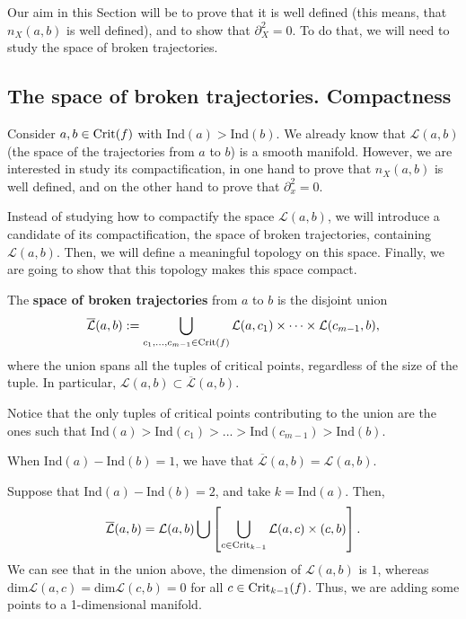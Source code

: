 Our aim in this Section will be to prove that it is well defined (this means, that $n_X(a,b)$ is well defined), and to show that $\partial_X^2 = 0$. To do that, we will need to study the space of broken trajectories.

\subsection{The space of broken trajectories. Compactness}

Consider $a, b \in \mathrm{Crit}(f)$ with $\text{Ind}(a) > \text{Ind}(b)$. We already know that $\mathcal{L}(a,b)$ (the space of the trajectories from $a$ to $b$) is a smooth manifold. However, we are interested in study its compactification, in one hand to prove that $n_X(a,b)$ is well defined, and on the other hand to prove that $\partial_x^2 = 0$.

Instead of studying how to compactify the space $\mathcal{L}(a,b)$, we will introduce a candidate of its compactification, the space of broken trajectories, containing $\mathcal{L}(a,b)$. Then, we will define a meaningful topology on this space. Finally, we are going to show that this topology makes this space compact.

\begin{deff}
The {\bf space of broken trajectories} from $a$ to $b$ is the disjoint union
\[\overline{\mathcal{L}}(a,b) := \bigcup_{c_1,...,c_{m-1} \in \mathrm{Crit}(f)} \mathcal{L}(a,c_1) \times \cdots \times \mathcal{L}(c_{m-1},b) ,\]
where the union spans all the tuples of critical points, regardless of the size of the tuple. In particular, $\mathcal{L}(a,b) \subset \overline{\mathcal{L}}(a,b)$.

Notice that the only tuples of critical points contributing to the union are the ones such that $\text{Ind}(a) > \text{Ind}(c_1) > ... > \text{Ind}(c_{m-1}) > \text{Ind}(b)$.
\end{deff}

\begin{rmrk}
When $\text{Ind}(a) - \text{Ind}(b) = 1$, we have that $\overline{\mathcal{L}}(a,b) = \mathcal{L}(a,b)$.
\end{rmrk}

\begin{rmrk}
Suppose that $\text{Ind}(a) - \text{Ind}(b) = 2$, and take $k = \text{Ind}(a)$. Then,
\[\overline{\mathcal{L}}(a,b) = \mathcal{L}(a,b) \bigcup \left[ \bigcup_{c \in \mathrm{Crit}_{k-1}} \mathcal{L}(a,c) \times \mathcal(c,b) \right] .\]
We can see that in the union above, the dimension of $\mathcal{L}(a,b)$ is $1$, whereas $\text{dim} \mathcal{L}(a,c) = \text{dim} \mathcal{L}(c,b) = 0$ for all $c \in \mathrm{Crit}_{k-1}(f)$. Thus, we are adding some points to a 1-dimensional manifold.
\end{rmrk}

